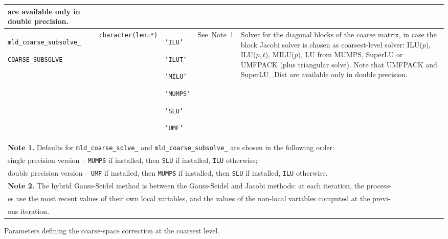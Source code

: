 \begin{center}
\begin{tabular}{|p{3.9cm}|l|p{1.7cm}|p{1.7cm}|p{8.6cm}|}
                           are available only in double precision. \\ \hline
\verb|mld_coarse_subsolve_| \par \verb|COARSE_SUBSOLVE| & \verb|character(len=*)|
                         & \texttt{'ILU'} \par \texttt{'ILUT'} \par \texttt{'MILU'} \par
                            \texttt{'MUMPS'} \par \texttt{'SLU'} \par \texttt{'UMF'} 
                         & See~Note~1
                         & Solver for the diagonal blocks of the coarse matrix,
                           in case the block Jacobi solver
                           is chosen as coarsest-level solver: ILU($p$), ILU($p,t$),
                           MILU($p$), LU from MUMPS, SuperLU or UMFPACK 
                          (plus triangular solve).
                          Note that UMFPACK and SuperLU\_Dist
                          are available only in double precision. \\
\hline
\multicolumn{5}{|l|}{{\bfseries Note 1.} Defaults for \texttt{mld\_coarse\_solve\_} and 
\texttt{mld\_coarse\_subsolve\_} are chosen in the following  order:} \\
\multicolumn{5}{|l|}{single precision version -- \texttt{MUMPS} if installed, 
                               then \texttt{SLU} if installed, 
                               \texttt{ILU} otherwise;}\\
\multicolumn{5}{|l|}{double precision version -- \texttt{UMF} if installed, 
                               then \texttt{MUMPS} if installed, then \texttt{SLU} if  
                               installed, \texttt{ILU} otherwise.}\\
\multicolumn{5}{|l|}{{\bfseries Note 2.} The hybrid Gauss-Seidel method is
between the Gauss-Seidel and Jacobi methods: at each iteration, the process-} \\
\multicolumn{5}{|l|}{es use the most recent values of their own local variables, and the values of
the non-local variables computed at the previ-}\\
\multicolumn{5}{|l|}{ous iteration.}\\
\hline
\end{tabular}
\end{center}
\caption{Parameters defining the coarse-space correction at the coarsest
level.\label{tab:p_coarse}} 
\esideways

